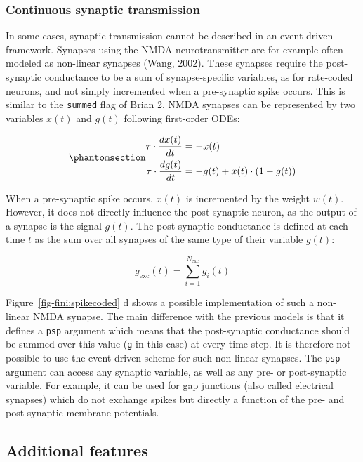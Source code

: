 \documentclass[
  11pt,
  a4paper,
]{scrbook}
\begin{document}
\subsubsection*{Continuous synaptic
transmission}\label{continuous-synaptic-transmission}

In some cases, synaptic transmission cannot be described in an
event-driven framework. Synapses using the NMDA neurotransmitter are for
example often modeled as non-linear synapses (Wang, 2002). These
synapses require the post-synaptic conductance to be a sum of
synapse-specific variables, as for rate-coded neurons, and not simply
incremented when a pre-synaptic spike occurs. This is similar to the
\texttt{summed} flag of Brian 2. NMDA synapses can be represented by two
variables \(x(t)\) and \(g(t)\) following first-order ODEs:

\begin{equation}\phantomsection\label{eq-fini:nmda}{
\begin{aligned}
\tau \cdot \frac{dx(t)}{dt} &= - x(t) \\
\tau \cdot \frac{dg(t)}{dt} &= - g(t) +  x(t) \cdot (1 - g(t))
\end{aligned}
}\end{equation}

When a pre-synaptic spike occurs, \(x(t)\) is incremented by the weight
\(w(t)\). However, it does not directly influence the post-synaptic
neuron, as the output of a synapse is the signal \(g(t)\). The
post-synaptic conductance is defined at each time \(t\) as the sum over
all synapses of the same type of their variable \(g(t)\):

\[
    g_\text{exc}(t) = \sum_{i=1}^{N_\text{exc}} g_i (t)
\]

Figure~\ref{fig-fini:spikecoded} d shows a possible implementation of
such a non-linear NMDA synapse. The main difference with the previous
models is that it defines a \texttt{psp} argument which means that the
post-synaptic conductance should be summed over this value (\texttt{g}
in this case) at every time step. It is therefore not possible to use
the event-driven scheme for such non-linear synapses. The \texttt{psp}
argument can access any synaptic variable, as well as any pre- or
post-synaptic variable. For example, it can be used for gap junctions
(also called electrical synapses) which do not exchange spikes but
directly a function of the pre- and post-synaptic membrane potentials.

\subsection{Additional features}\label{additional-features}
\end{document}
